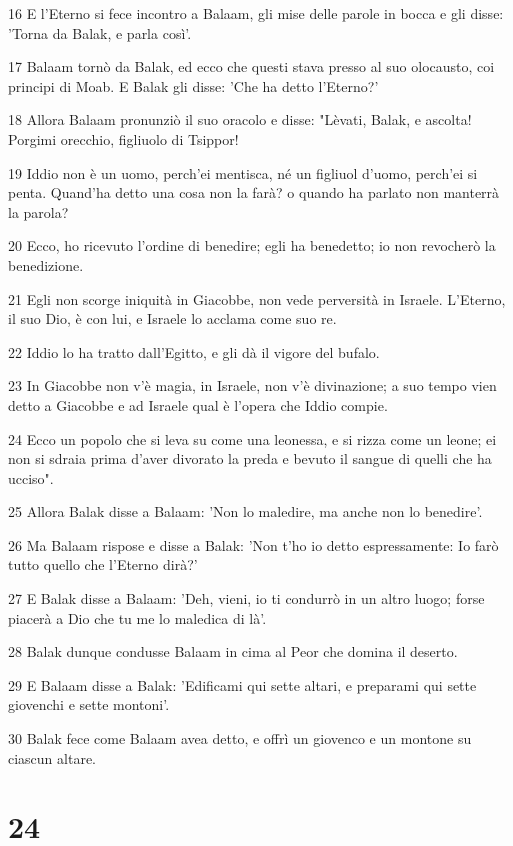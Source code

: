 \par 16 E l'Eterno si fece incontro a Balaam, gli mise delle parole in bocca e gli disse: 'Torna da Balak, e parla così'.
\par 17 Balaam tornò da Balak, ed ecco che questi stava presso al suo olocausto, coi principi di Moab. E Balak gli disse: 'Che ha detto l'Eterno?'
\par 18 Allora Balaam pronunziò il suo oracolo e disse: "Lèvati, Balak, e ascolta! Porgimi orecchio, figliuolo di Tsippor!
\par 19 Iddio non è un uomo, perch'ei mentisca, né un figliuol d'uomo, perch'ei si penta. Quand'ha detto una cosa non la farà? o quando ha parlato non manterrà la parola?
\par 20 Ecco, ho ricevuto l'ordine di benedire; egli ha benedetto; io non revocherò la benedizione.
\par 21 Egli non scorge iniquità in Giacobbe, non vede perversità in Israele. L'Eterno, il suo Dio, è con lui, e Israele lo acclama come suo re.
\par 22 Iddio lo ha tratto dall'Egitto, e gli dà il vigore del bufalo.
\par 23 In Giacobbe non v'è magia, in Israele, non v'è divinazione; a suo tempo vien detto a Giacobbe e ad Israele qual è l'opera che Iddio compie.
\par 24 Ecco un popolo che si leva su come una leonessa, e si rizza come un leone; ei non si sdraia prima d'aver divorato la preda e bevuto il sangue di quelli che ha ucciso".
\par 25 Allora Balak disse a Balaam: 'Non lo maledire, ma anche non lo benedire'.
\par 26 Ma Balaam rispose e disse a Balak: 'Non t'ho io detto espressamente: Io farò tutto quello che l'Eterno dirà?'
\par 27 E Balak disse a Balaam: 'Deh, vieni, io ti condurrò in un altro luogo; forse piacerà a Dio che tu me lo maledica di là'.
\par 28 Balak dunque condusse Balaam in cima al Peor che domina il deserto.
\par 29 E Balaam disse a Balak: 'Edificami qui sette altari, e preparami qui sette giovenchi e sette montoni'.
\par 30 Balak fece come Balaam avea detto, e offrì un giovenco e un montone su ciascun altare.

\chapter{24}

